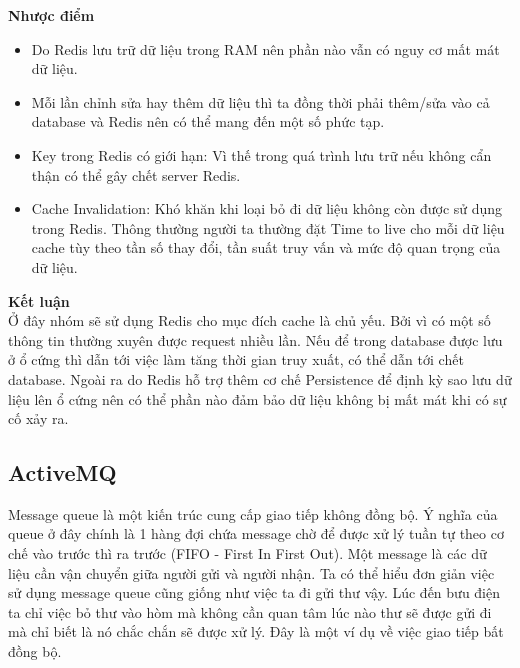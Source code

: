             \textbf{Nhược điểm}
            
            \begin{itemize}
                \item Do Redis lưu trữ dữ liệu trong RAM nên phần nào vẫn có nguy cơ mất mát dữ liệu.
                \item Mỗi lần chỉnh sửa hay thêm dữ liệu thì ta đồng thời phải thêm/sửa vào cả database và Redis nên có thể mang đến một số phức tạp.
                \item Key trong Redis có giới hạn: Vì thế trong quá trình lưu trữ nếu không cẩn thận có thể gây chết server Redis.
                \item Cache Invalidation: Khó khăn khi loại bỏ đi dữ liệu không còn được sử dụng trong Redis. Thông thường người ta thường đặt Time to live cho mỗi dữ liệu cache tùy theo tần số thay đổi, tần suất truy vấn và mức độ quan trọng của dữ liệu.
            \end{itemize}
            
            \textbf{Kết luận}\\
            
            Ở đây nhóm sẽ sử dụng Redis cho mục đích cache là chủ yếu. Bởi vì có một số thông tin thường xuyên được request nhiều lần. Nếu để trong database được lưu ở ổ cứng thì dẫn tới việc làm tăng thời gian truy xuất, có thể dẫn tới chết database. Ngoài ra do Redis hỗ trợ thêm cơ chế Persistence để định kỳ sao lưu dữ liệu lên ổ cứng nên có thể phần nào đảm bảo dữ liệu không bị mất mát khi có sự cố xảy ra.
            
            \subsection{ActiveMQ}
            
            Message queue là một kiến trúc cung cấp giao tiếp không đồng bộ. Ý nghĩa của queue ở đây chính là 1 hàng đợi chứa message chờ để được xử lý tuần tự theo cơ chế vào trước thì ra trước (FIFO - First In First Out). Một message là các dữ liệu cần vận chuyển giữa người gửi và người nhận. Ta có thể hiểu đơn giản việc sử dụng message queue cũng giống như việc ta đi gửi thư vậy. Lúc đến bưu điện ta chỉ việc bỏ thư vào hòm mà không cần quan tâm lúc nào thư sẽ được gửi đi mà chỉ biết là nó chắc chắn sẽ được xử lý. Đây là một ví dụ về việc giao tiếp bất đồng bộ.
            
